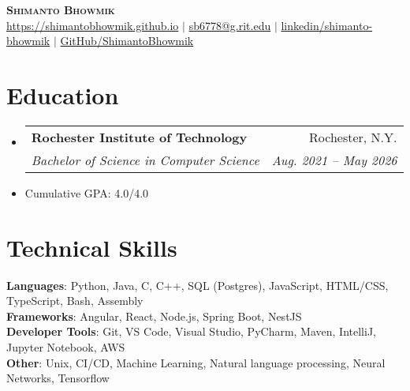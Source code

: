 \documentclass{article}
\makeatletter
\newcommand{\resumeItem}[1]{
  \item\small{
    {#1 \vspace{-2pt}}
  }
}
\newcommand{\resumeSubheading}[4]{
  \vspace{-2pt}\item
    \begin{tabular*}{0.97\textwidth}[t]{l@{\extracolsep{\fill}}r}
      \textbf{#1} & #2 \\
      \textit{\small#3} & \textit{\small #4} \\
    \end{tabular*}\vspace{-7pt}
}
\newcommand{\resumeSubHeadingListStart}{\begin{itemize}[leftmargin=0.15in, label={}]}
\newcommand{\resumeSubHeadingListEnd}{\end{itemize}}
\makeatother
\begin{document}
\begin{center}
    \textbf{\Huge \scshape Shimanto Bhowmik} \\ \vspace{1pt}
    \href{https://shimantobhowmik.github.io}{\small{https://shimantobhowmik.github.io}} $|$ 
    \href{mailto:sb6778@g.rit.edu}{\small{sb6778@g.rit.edu}} $|$ 
    \href{https://www.linkedin.com/in/shimantobhowmik/}{\small{linkedin/shimanto-bhowmik}} $|$ 
    \href{https://github.com/ShimantoBhowmik}{\small{GitHub/ShimantoBhowmik}}
\end{center}




\section{Education}
\resumeSubHeadingListStart
\resumeSubheading
{Rochester Institute of Technology}{Rochester, N.Y.}
{Bachelor of Science in Computer Science}{Aug. 2021 -- May 2026}
\resumeItem{Cumulative GPA: 4.0/4.0}
\resumeSubHeadingListEnd

%
\section{Technical Skills}
\begin{itemize}[leftmargin=0.15in, label={}]
    \small{\item{
        \textbf{Languages}{: Python, Java, C, C++, SQL (Postgres), JavaScript, HTML/CSS, TypeScript, Bash, Assembly} \\
        \textbf{Frameworks}{: Angular, React, Node.js, Spring Boot, NestJS} \\
        \textbf{Developer Tools}{: Git, VS Code, Visual Studio, PyCharm, Maven, IntelliJ, Jupyter Notebook, AWS} \\
        \textbf{Other}{: Unix, CI/CD, Machine Learning, Natural language processing, Neural Networks, Tensorflow}
    }}
\end{itemize}
\vfill
\end{document}
